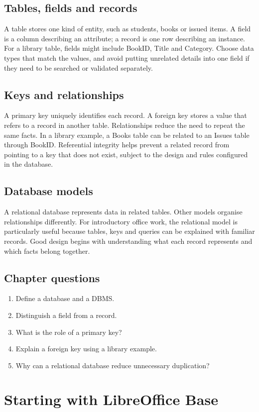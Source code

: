 \documentclass[11pt,openany,oneside]{book}
\begin{document}
\section{Tables, fields and records}
A table stores one kind of entity, such as students, books or issued items. A field is a column describing an attribute; a record is one row describing an instance. For a library table, fields might include BookID, Title and Category. Choose data types that match the values, and avoid putting unrelated details into one field if they need to be searched or validated separately.
\section{Keys and relationships}
A primary key uniquely identifies each record. A foreign key stores a value that refers to a record in another table. Relationships reduce the need to repeat the same facts. In a library example, a Books table can be related to an Issues table through BookID. Referential integrity helps prevent a related record from pointing to a key that does not exist, subject to the design and rules configured in the database.
\section{Database models}
A relational database represents data in related tables. Other models organise relationships differently. For introductory office work, the relational model is particularly useful because tables, keys and queries can be explained with familiar records. Good design begins with understanding what each record represents and which facts belong together.
\section{Chapter questions}
\begin{enumerate}\item Define a database and a DBMS.\item Distinguish a field from a record.\item What is the role of a primary key?\item Explain a foreign key using a library example.\item Why can a relational database reduce unnecessary duplication?\end{enumerate}

\chapter{Starting with LibreOffice Base}
\end{document}
